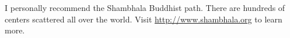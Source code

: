 I personally recommend the Shambhala Buddhist path. There are hundreds of centers scattered all over
the world. Visit \url{http://www.shambhala.org} to learn more.










